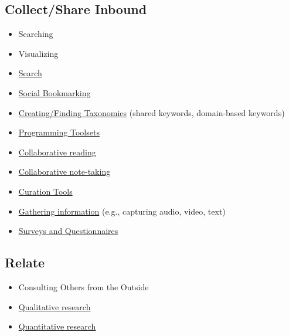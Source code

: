 \subsection{Collect/Share Inbound}

\begin{itemize}
\item
  Searching
\item
  Visualizing
\end{itemize}

\begin{itemize}
\item
  \href{http://peeragogy.org/search/}{Search}
\item
  \href{http://peeragogy.org/social-bookmarking/}{Social Bookmarking}
\item
  \href{http://peeragogy.org/taxonomics/}{Creating/Finding Taxonomies}
  (shared keywords, domain-based keywords)
\item
  \href{http://peeragogy.org/programming-toolsets/}{Programming
  Toolsets}
\item
  \href{http://peeragogy.org/collaborative-reading/}{Collaborative
  reading}
\item
  \href{http://peeragogy.org/collaborative-note-taking/}{Collaborative
  note-taking}
\item
  \href{http://peeragogy.org/curation-tools/}{Curation Tools}
\item
  \href{http://peeragogy.org/recording-information-inputs/}{Gathering
  information} (e.g., capturing audio, video, text)
\item
  \href{http://peeragogy.org/surveys-and-questionnaires/}{Surveys and
  Questionnaires}
\end{itemize}

\subsection{Relate}

\begin{itemize}
\item
  Consulting Others from the Outside
\end{itemize}

\begin{itemize}
\item
  \href{http://peeragogy.org/qualitative-research/}{Qualitative
  research}
\item
  \href{http://peeragogy.org/quantitative-research/}{Quantitative
  research}
\end{itemize}

